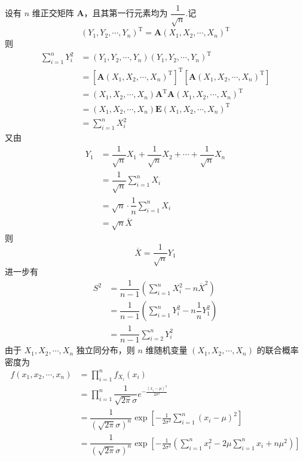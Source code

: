 \begin{myproof}
    设有 $n$ 维正交矩阵 $\boldsymbol{A}$，且其第一行元素均为 $\dfrac{1}{\sqrt{n}}$.记
    $$
    (Y_1, Y_2, \cdots, Y_n)^{\text{T}} = \boldsymbol{A} (X_1, X_2, \cdots, X_n)^{\text{T}}
    $$
    则
    $$
    \begin{aligned}
        \sum_{i=1}^n Y_i^2 &= (Y_1, Y_2, \cdots, Y_n) (Y_1, Y_2, \cdots, Y_n)^{\text{T}} \\
        &= [\boldsymbol{A} (X_1, X_2, \cdots, X_n)^{\text{T}}]^{\text{T}} [\boldsymbol{A} (X_1, X_2, \cdots, X_n)^{\text{T}}] \\
        &= (X_1, X_2, \cdots, X_n) \boldsymbol{A}^{\text{T}} \boldsymbol{A} (X_1, X_2, \cdots, X_n)^{\text{T}} \\
        &= (X_1, X_2, \cdots, X_n) \boldsymbol{E} (X_1, X_2, \cdots, X_n)^{\text{T}} \\
        &= \sum_{i=1}^n X_i^2
    \end{aligned}
    $$
    又由
    $$
    \begin{aligned}
        Y_1 &= \dfrac{1}{\sqrt{n}} X_1 + \dfrac{1}{\sqrt{n}} X_2 + \cdots + \dfrac{1}{\sqrt{n}} X_n \\
        &= \dfrac{1}{\sqrt{n}} \sum_{i=1}^{n} X_i \\
        &= \sqrt{n} \cdot \dfrac{1}{n} \sum_{i=1}^{n} X_i \\
        &= \sqrt{n} \overline{X}
    \end{aligned}
    $$
    则
    $$
    \overline{X} = \dfrac{1}{\sqrt{n}} Y_1
    $$
    进一步有
    $$
    \begin{aligned}
        S^2 &= \dfrac{1}{n-1} \left( \sum_{i=1}^n X_i^2 - n \overline{X}^2 \right) \\
        &= \dfrac{1}{n-1} \left( \sum_{i=1}^n Y_i^2 - n \dfrac{1}{n} Y_1^2 \right) \\
        &= \dfrac{1}{n-1} \sum_{i=2}^n Y_i^2
    \end{aligned}
    $$
    由于 $X_1,X_2,\cdots,X_n$ 独立同分布，则 $n$ 维随机变量 $(X_1, X_2, \cdots, X_n)$ 的联合概率密度为
    $$
    \begin{aligned}
        f(x_1, x_2, \cdots, x_n) &= \prod_{i=1}^n f_{X_i}(x_i) \\
        &= \prod_{i=1}^n \dfrac{1}{\sqrt{2 \pi} \sigma} e^{-\frac{(x_i - \mu)^2}{2 \sigma^2}} \\
        &= \dfrac{1}{(\sqrt{2 \pi} \sigma)^n} \exp{ \left[-\frac{1}{2 \sigma^2} \sum_{i=1}^{n} (x_i - \mu)^2 \right] } \\
        &= \dfrac{1}{(\sqrt{2 \pi} \sigma)^n} \exp{ \left[-\frac{1}{2 \sigma^2} \left( \sum_{i=1}^{n} x_i^2 - 2 \mu \sum_{i=1}^{n} x_i + n \mu^2 \right) \right] } \\

\end{aligned}$$
\end{myproof}

